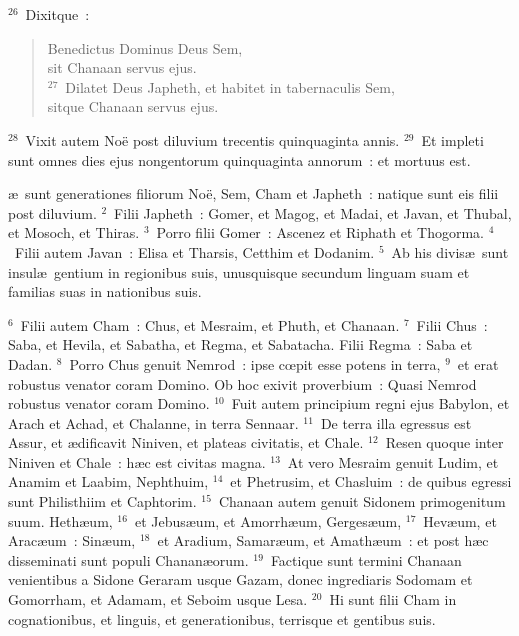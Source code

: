 ${}^{26}$~Dixitque~: \begin{verse}Benedictus Dominus Deus Sem,\\ sit Chanaan servus ejus.\\
${}^{27}$~Dilatet Deus Japheth, et habitet in tabernaculis Sem,\\ sitque Chanaan servus ejus.\end{verse}


${}^{28}$~Vixit autem No\"e post diluvium trecentis quinquaginta annis.
${}^{29}$~Et impleti sunt omnes dies ejus nongentorum quinquaginta annorum~: et mortuus est.

\bchapter
{}\ae\ sunt generationes filiorum No\"e, Sem, Cham et Japheth~: natique sunt eis filii post diluvium.
${}^{2}$~Filii Japheth~: Gomer, et Magog, et Madai, et Javan, et Thubal, et Mosoch, et Thiras.
${}^{3}$~Porro filii Gomer~: Ascenez et Riphath et Thogorma.
${}^{4}$~Filii autem Javan~: Elisa et Tharsis, Cetthim et Dodanim.
${}^{5}$~Ab his divis\ae\ sunt insul\ae\ gentium in regionibus suis, unusquisque secundum linguam suam et familias suas in nationibus suis.


${}^{6}$~Filii autem Cham~: Chus, et Mesraim, et Phuth, et Chanaan.
${}^{7}$~Filii Chus~: Saba, et Hevila, et Sabatha, et Regma, et Sabatacha. Filii Regma~: Saba et Dadan.
${}^{8}$~Porro Chus genuit Nemrod~: ipse cœpit esse potens in terra,
${}^{9}$~et erat robustus venator coram Domino. Ob hoc exivit proverbium~: Quasi Nemrod robustus venator coram Domino.
${}^{10}$~Fuit autem principium regni ejus Babylon, et Arach et Achad, et Chalanne, in terra Sennaar.
${}^{11}$~De terra illa egressus est Assur, et \ae dificavit Niniven, et plateas civitatis, et Chale.
${}^{12}$~Resen quoque inter Niniven et Chale~: h\ae c est civitas magna.
${}^{13}$~At vero Mesraim genuit Ludim, et Anamim et Laabim, Nephthuim,
${}^{14}$~et Phetrusim, et Chasluim~: de quibus egressi sunt Philisthiim et Caphtorim.
${}^{15}$~Chanaan autem genuit Sidonem primogenitum suum. Heth\ae um,
${}^{16}$~et Jebus\ae um, et Amorrh\ae um, Gerges\ae um,
${}^{17}$~Hev\ae um, et Arac\ae um~: Sin\ae um,
${}^{18}$~et Aradium, Samar\ae um, et Amath\ae um~: et post h\ae c disseminati sunt populi Chanan\ae orum.
${}^{19}$~Factique sunt termini Chanaan venientibus a Sidone Geraram usque Gazam, donec ingrediaris Sodomam et Gomorrham, et Adamam, et Seboim usque Lesa.
${}^{20}$~Hi sunt filii Cham in cognationibus, et linguis, et generationibus, terrisque et gentibus suis.


